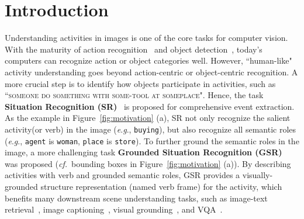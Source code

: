 \documentclass[letterpaper]{article} %
\newcommand{\eg}{\textit{e}.\textit{g}.}
\newcommand{\cf}{\textit{cf.}}
\begin{document}
\section{Introduction}




Understanding activities in images is one of the core tasks for computer vision.
With the maturity of action recognition~\cite{carreira2017quo, wang2016temporal} and object detection~\cite{ren2015faster}, today's computers can recognize action or object categories well.
However, ``human-like" activity understanding goes beyond action-centric or object-centric recognition.
A more crucial step is to identify how objects participate in activities, such as ``\textsc{someone do something with some-tool at someplace}".
Hence, the task \textbf{Situation Recognition (SR)}~\cite{yatskar2016situation} is proposed for comprehensive event extraction.
As the example in Figure~\ref{fig:motivation} (a), SR not only recognize the salient activity(or verb) in the image (\eg, \texttt{buying}), but also recognize all semantic roles (\eg, \texttt{agent} is \texttt{woman}, \texttt{place} is \texttt{store}). To further ground the semantic roles in the image, a more challenging task \textbf{Grounded Situation Recognition (GSR)}~\cite{pratt2020grounded} was proposed (\cf~bounding boxes in Figure~\ref{fig:motivation} (a)). By describing activities with verb and grounded semantic roles, GSR provides a visually-grounded structure representation (named verb frame) for the activity, which benefits many downstream scene understanding tasks, such as image-text retrieval~\cite{gordo2016deep, noh2017large}, image captioning~\cite{mallya2017recurrent,chen2021human,chen2017sca}, visual grounding~\cite{chen2021ref}, and VQA~\cite{cadene2019murel,Chen_2020_CVPR,chen2021counterfactual,xiao2022video}.
\end{document}
